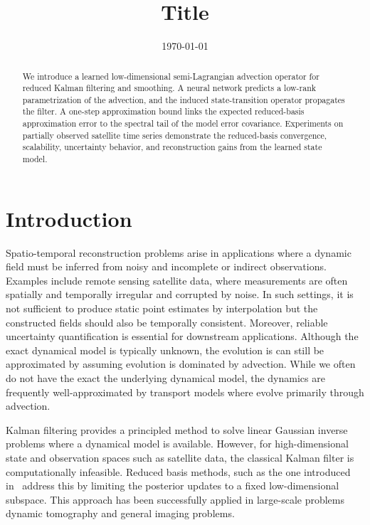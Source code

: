 \documentclass[a4paper,12pt]{article}
\title{Title}
\author{}
\date{\today}
\begin{document}
\maketitle

\begin{abstract}
    We introduce a learned low-dimensional semi-Lagrangian advection operator for reduced Kalman filtering and smoothing.
    A neural network predicts a low-rank parametrization of the advection, and the induced state-transition operator propagates the filter.
    A one-step approximation bound links the expected reduced-basis approximation error to the spectral tail of the model error covariance.
    Experiments on partially observed satellite time series demonstrate the reduced-basis convergence, scalability, uncertainty behavior, and reconstruction gains from the learned state model.
\end{abstract}

\section{Introduction}
Spatio-temporal reconstruction problems arise in applications where a dynamic field must be inferred from noisy and incomplete or indirect observations.
Examples include remote sensing satellite data, where measurements are often spatially and temporally irregular and corrupted by noise.
In such settings, it is not sufficient to produce static point estimates by interpolation but the constructed fields should also be temporally consistent.
Moreover, reliable uncertainty quantification is essential for downstream applications.
Although the exact dynamical model is typically unknown, the evolution is can still be approximated by assuming evolution is dominated by advection.
While we often do not have the exact the underlying dynamical model, the dynamics are frequently well-approximated by transport models where evolve primarily through advection.

Kalman filtering provides a principled method to solve linear Gaussian inverse problems where a dynamical model is available.
However, for high-dimensional state and observation spaces such as satellite data, the classical Kalman filter is computationally infeasible.
Reduced basis methods, such as the one introduced in~\cite{solonen} address this by limiting the posterior updates to a fixed low-dimensional subspace.
This approach has been successfully applied in large-scale problems dynamic tomography and general imaging problems.~\cite{xraykfdr,opticalflowkfdr}
\end{document}
